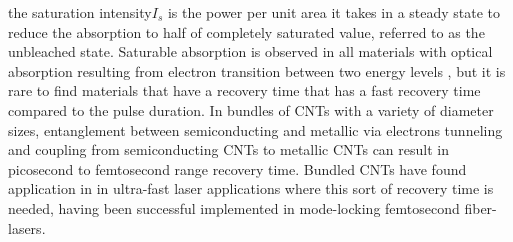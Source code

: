 the saturation intensity$I_s$ is the power per unit area it takes in a steady state to reduce the absorption to half of completely saturated value, referred to as the unbleached state. Saturable absorption is observed in all materials with optical absorption resulting from electron transition between two energy levels \cite{thomsen}, but it is rare to find materials that have a recovery time that has a fast recovery time compared to the pulse duration. In bundles of  CNTs  with a variety of diameter sizes, entanglement between semiconducting and metallic via electrons tunneling and coupling from semiconducting CNTs to metallic CNTs \cite{gambetta} can result in picosecond to femtosecond range recovery time. Bundled CNTs have found application in  in ultra-fast laser applications where this sort of recovery time is needed, having been successful implemented in mode-locking femtosecond fiber-lasers\cite{fl1, fl2, fl3, fl4}. 

